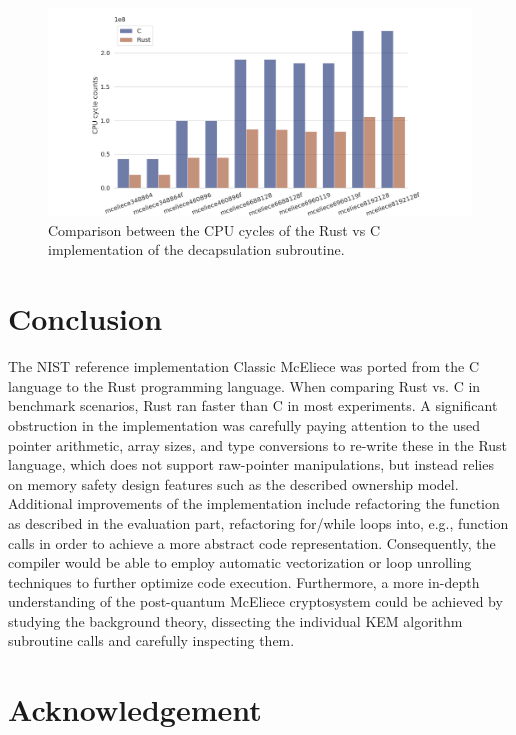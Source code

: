 \documentclass[11pt,
  oneside,openany,    %
]{scrreprt}
\begin{document}
\begin{figure}[H]
\centering
  \includegraphics[width=1\textwidth]{images/decapsulation.png}
  \caption{Comparison between the CPU cycles of the Rust vs C implementation of the decapsulation subroutine.}
  \label{fig:plot1}
\end{figure}

\chapter{Conclusion}
\label{chap:conclusion}

The NIST reference implementation Classic McEliece was ported from the C language to the Rust programming language. When comparing Rust vs. C in benchmark scenarios, Rust ran faster than C in most experiments. A significant obstruction in the implementation was carefully paying attention to the used pointer arithmetic, array sizes, and type conversions to re-write these in the Rust language, which does not support raw-pointer manipulations, but instead relies on memory safety design features such as the described ownership model. Additional improvements of the implementation include refactoring the  function as described in the evaluation part, refactoring for/while loops into, e.g.,  function calls in order to achieve a more abstract code representation. Consequently, the compiler would be able to employ automatic vectorization or loop unrolling techniques to further optimize code execution. Furthermore, a more in-depth understanding of the post-quantum McEliece cryptosystem could be achieved by studying the background theory, dissecting the individual KEM algorithm subroutine calls and carefully inspecting them.


\chapter*{Acknowledgement}
\label{chap:acknowledgement}
\end{document}
